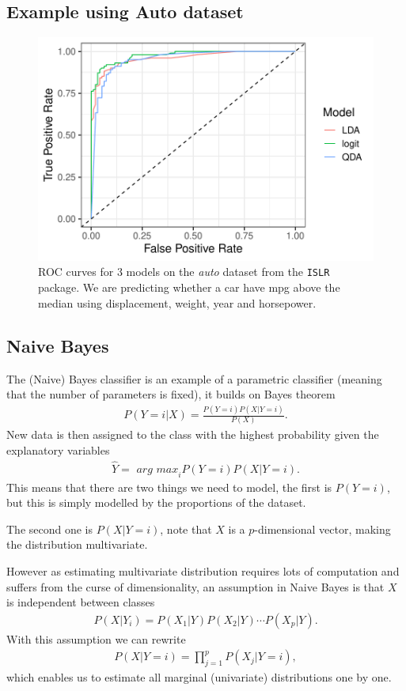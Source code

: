 \documentclass[aspectratio=169,10pt]{beamer}
\begin{document}
\subsection{Example using Auto dataset}
\begin{frame}{\secname}{\subsecname}
  \begin{figure}
    \includegraphics[width=.55\textwidth]{scripts/output/mpg_roc.pdf}
    \caption{ROC curves for 3 models on the \textit{auto} dataset from the \texttt{ISLR} package. We are predicting whether a car have mpg above the median using displacement, weight, year and horsepower.}
  \end{figure}
\end{frame}

\subsection{Naive Bayes}
\begin{frame}{\secname}{\subsecname}
  The (Naive) Bayes classifier is an example of a parametric classifier (meaning that the number of parameters is fixed), it builds on Bayes theorem
  \begin{align}
    P(Y = i| X) = \frac{P(Y = i)P(X| Y=i)}{P(X)}.
  \end{align}
  New data is then assigned to the class with the highest probability given the explanatory variables
  \begin{align}
    \hat{Y} = \textit{ arg max}_i P(Y = i)P(X | Y = i).
  \end{align}
  This means that there are two things we need to model, the first is $P(Y = i)$, but this is simply modelled by the proportions of the dataset.
\end{frame}

\begin{frame}{\secname}{\subsecname}
  The second one is $P(X | Y = i)$, note that $X$ is a $p$-dimensional vector, making the distribution multivariate.
  
  However as estimating multivariate distribution requires lots of computation and suffers from the curse of dimensionality, an assumption in Naive Bayes is that $X$ is independent between classes
  \begin{align}
    P(X | Y_i) = P(X_1|Y)P(X_2|Y)\cdots P(X_p|Y).
  \end{align}
  With this assumption we can rewrite
  \begin{align}
    P(X | Y = i) = \prod_{j=1}^p P(X_j | Y = i),
  \end{align}
  which enables us to estimate all marginal (univariate) distributions one by one.
\end{frame}
\end{document}

